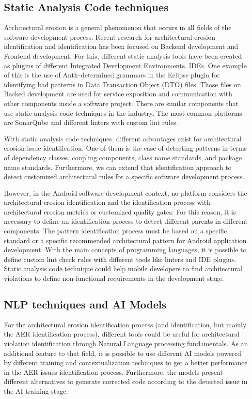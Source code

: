 \subsection{Static Analysis Code techniques}
Architectural erosion is a general phenomenon that occurs in all fields of the software development process. Recent research for architectural erosion identification and identification has been focused on Backend development and Frontend development. For this, different static analysis tools have been created as plugins of different Integrated Development Environments. IDEs. One example of this is the use of Antlr-determined grammars in the Eclipse plugin for identifying bad patterns in Data Transaction Object (DTO) files. Those files on Backed development are used for service exposition and communication with other components inside a software project.
There are similar components that use static analysis code techniques in the industry. The most common platforms are SonarQube and different linters with custom lint rules.

With static analysis code techniques, different advantages exist for architectural erosion issue identification. One of them is the ease of detecting patterns in terms of dependency classes, coupling components, class name standards, and package name standards. Furthermore, we can extend that identification approach to detect customized architectural rules for a specific software development process. \citet{master-thesis-aer-backend}

However, in the Android software development context, no platform considers the architectural erosion identification and the identification process with architectural erosion metrics or customized quality gates. For this reason, it is necessary to define an identification process to detect different parents in different components. The pattern identification process must be based on a specific standard or a specific recommended architectural pattern for Android application development. With the main concepts of programming languages, it is possible to define custom lint check rules with different tools like linters and IDE plugins. Static analysis code technique could help mobile developers to find architectural violations to define non-functional requirements in the development stage.


\subsection{NLP techniques and AI Models}
For the architectural erosion identification process (and identification, but mainly the AER identification process), different tools could be useful for architectural violation identification through Natural Language processing fundamentals. As an additional feature to that field, it is possible to use different AI models powered by different training and contextualization techniques to get a better performance in the AER issues identification process. Furthermore, the models present different alternatives to generate corrected code according to the detected issue in the AI training stage.

